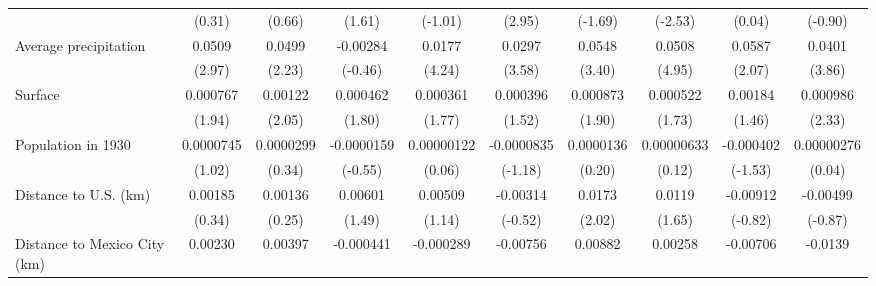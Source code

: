 {\begin{tabular}{l*{9}{c}}
                    &      (0.31)         &      (0.66)         &      (1.61)         &     (-1.01)         &      (2.95)         &     (-1.69)         &     (-2.53)         &      (0.04)         &     (-0.90)         \\
[1em]
Average precipitation&      0.0509\sym{**} &      0.0499\sym{*}  &    -0.00284         &      0.0177\sym{***}&      0.0297\sym{***}&      0.0548\sym{***}&      0.0508\sym{***}&      0.0587\sym{*}  &      0.0401\sym{***}\\
                    &      (2.97)         &      (2.23)         &     (-0.46)         &      (4.24)         &      (3.58)         &      (3.40)         &      (4.95)         &      (2.07)         &      (3.86)         \\
[1em]
Surface             &    0.000767         &     0.00122\sym{*}  &    0.000462         &    0.000361         &    0.000396         &    0.000873         &    0.000522         &     0.00184         &    0.000986\sym{*}  \\
                    &      (1.94)         &      (2.05)         &      (1.80)         &      (1.77)         &      (1.52)         &      (1.90)         &      (1.73)         &      (1.46)         &      (2.33)         \\
[1em]
Population in 1930  &   0.0000745         &   0.0000299         &  -0.0000159         &  0.00000122         &  -0.0000835         &   0.0000136         &  0.00000633         &   -0.000402         &  0.00000276         \\
                    &      (1.02)         &      (0.34)         &     (-0.55)         &      (0.06)         &     (-1.18)         &      (0.20)         &      (0.12)         &     (-1.53)         &      (0.04)         \\
[1em]
Distance to U.S. (km)&     0.00185         &     0.00136         &     0.00601         &     0.00509         &    -0.00314         &      0.0173\sym{*}  &      0.0119         &    -0.00912         &    -0.00499         \\
                    &      (0.34)         &      (0.25)         &      (1.49)         &      (1.14)         &     (-0.52)         &      (2.02)         &      (1.65)         &     (-0.82)         &     (-0.87)         \\
[1em]
Distance to Mexico City (km)&     0.00230         &     0.00397         &   -0.000441         &   -0.000289         &    -0.00756         &     0.00882         &     0.00258         &    -0.00706         &     -0.0139         \\

\end{tabular}}
